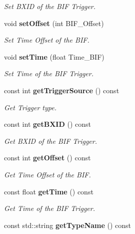 \begin{DoxyCompactItemize}
\begin{DoxyCompactList}\small\item\em Set B\-X\-I\-D of the B\-I\-F Trigger. \end{DoxyCompactList}\item 
void {\bf set\-Offset} (int B\-I\-F\-\_\-\-Offset)\label{classCALICE_1_1BIFBlock_afed1536822bb3c10b959f2e467220f6c}

\begin{DoxyCompactList}\small\item\em Set Time Offset of the B\-I\-F. \end{DoxyCompactList}\item 
void {\bf set\-Time} (float Time\-\_\-\-B\-I\-F)\label{classCALICE_1_1BIFBlock_aa7286d6fe67c4c941537a0f156812247}

\begin{DoxyCompactList}\small\item\em Set Time of the B\-I\-F Trigger. \end{DoxyCompactList}\item 
const int {\bf get\-Trigger\-Source} () const \label{classCALICE_1_1BIFBlock_a27cde06f0406d3908efc8ec0b047332e}

\begin{DoxyCompactList}\small\item\em Get Trigger type. \end{DoxyCompactList}\item 
const int {\bf get\-B\-X\-I\-D} () const \label{classCALICE_1_1BIFBlock_a7104742c4a7d0a3a17b0e195371ccf4c}

\begin{DoxyCompactList}\small\item\em Get B\-X\-I\-D of the B\-I\-F Trigger. \end{DoxyCompactList}\item 
const int {\bf get\-Offset} () const \label{classCALICE_1_1BIFBlock_ab1c2e7d77b59f9725db51ed27bc74312}

\begin{DoxyCompactList}\small\item\em Get Time Offset of the B\-I\-F. \end{DoxyCompactList}\item 
const float {\bf get\-Time} () const \label{classCALICE_1_1BIFBlock_a78df0b79c7631dd015db810eb5e653cd}

\begin{DoxyCompactList}\small\item\em Get Time of the B\-I\-F Trigger. \end{DoxyCompactList}\item 
const std\-::string {\bf get\-Type\-Name} () const \label{classCALICE_1_1BIFBlock_afedd9050ce2f4ae465c0c5c69ace43e9}


\end{DoxyCompactItemize}
